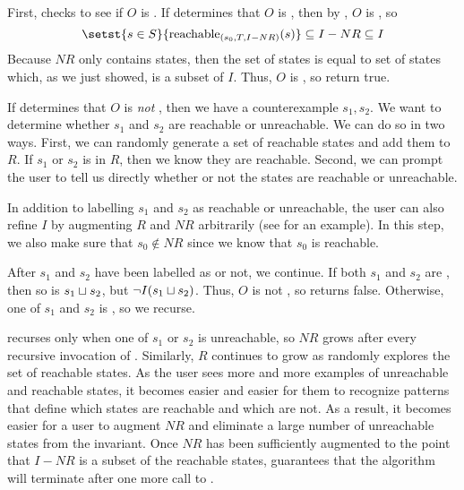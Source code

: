 First, \Helper{} checks to see if $O$ is .
%
If \IsIclosed{} determines that $O$ is , then by
, $O$ is , so
\[
  \setst{s \in S}{\stireachablepredicate{s_0}{T}{I-NR}{s}}
    \subseteq I - NR
    \subseteq I
\]
Because $NR$ only contains \sTIunreachable{} states, then the set of
\sTIreachable{} states is equal to set of  states
which, as we just showed, is a subset of $I$.  Thus, $O$ is \sTIconfluent{}, so
\Helper{} return true.

If \IsIclosed{} determines that $O$ is \emph{not} , then we
have a counterexample $s_1, s_2$. We want to determine whether $s_1$ and $s_2$
are reachable or unreachable. We can do so in two ways.
%
First, we can randomly generate a set of reachable states and add them to $R$.
If $s_1$ or $s_2$ is in $R$, then we know they are reachable.
%
Second, we can prompt the user to tell us directly whether or not the states
are reachable or unreachable.

In addition to labelling $s_1$ and $s_2$ as reachable or unreachable, the user
can also refine $I$ by augmenting $R$ and $NR$ arbitrarily (see
 for an example). In this step, we also make
sure that $s_0 \notin NR$ since we know that $s_0$ is reachable.

After $s_1$ and $s_2$ have been labelled as \sTIreachable{} or not, we
continue. If both $s_1$ and $s_2$ are \sTIreachable{}, then so is $s_1 \sqcup
s_2$, but $\lnot I(s_1 \sqcup s_2)$. Thus, $O$ is not \sTIconfluent{}, so
\Helper{} returns false. Otherwise, one of $s_1$ and $s_2$ is
\sTIunreachable{}, so we recurse.

\Helper{} recurses only when one of $s_1$ or $s_2$ is unreachable, so $NR$
grows after every recursive invocation of \Helper{}. Similarly, $R$ continues
to grow as \Helper{} randomly explores the set of reachable states. As the user
sees more and more examples of unreachable and reachable states, it becomes
easier and easier for them to recognize patterns that define which states are
reachable and which are not. As a result, it becomes easier for a user to
augment $NR$ and eliminate a large number of unreachable states from the
invariant. Once $NR$ has been sufficiently augmented to the point that $I - NR$
is a subset of the reachable states, 
guarantees that the algorithm will terminate after one more call to \IsIclosed.


